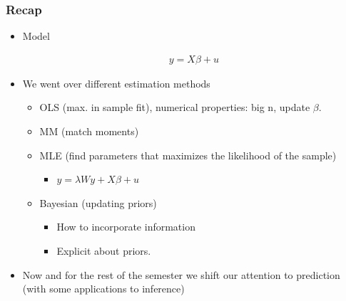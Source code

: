 \documentclass[
  shownotes,
  xcolor={svgnames},
  hyperref={colorlinks,citecolor=DarkBlue,linkcolor=DarkRed,urlcolor=DarkBlue}
  , aspectratio=169]{beamer}
\begin{document}
\begin{frame}
\frametitle{Recap}

\begin{itemize} 
    \item Model

    \begin{align}
    y = X \beta + u
    \end{align}
    
    \item We went over different estimation methods
    \begin{itemize} 
      \item OLS (max. in sample fit), numerical properties: big n, update $\beta$.
      \medskip
      \item MM (match moments)
      \medskip
      \item MLE (find parameters that maximizes the likelihood of the sample)
      \medskip
      \begin{itemize}
        \item $y = \lambda Wy + X\beta + u$
      \end{itemize}
      \item Bayesian (updating priors)
      \medskip
      \begin{itemize}
        \item How to incorporate information
        \item Explicit about priors.
      \end{itemize}
    \end{itemize}    
    \medskip
    \item Now and for the rest of the semester we shift our attention to prediction (with some applications to inference)
\end{itemize}
\end{frame}
\end{document}

